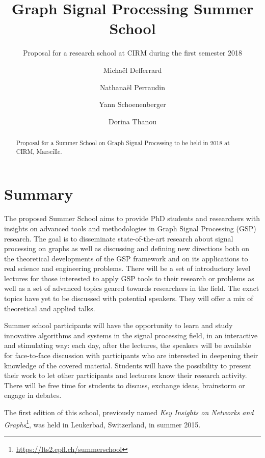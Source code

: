 \documentclass[a4paper]{scrartcl}
\begin{document}
\title{Graph Signal Processing Summer School}
\subtitle{Proposal for a research school at CIRM during the first semester 2018}
\author{
	Michaël Defferrard \and
	Nathanaël Perraudin \and
	Yann Schoenenberger \and
	Dorina Thanou
}
\maketitle

\begin{abstract}
	Proposal for a Summer School on Graph Signal Processing to be held in 2018
	at CIRM, Marseille.
\end{abstract}

\section{Summary}

The proposed Summer School aims to provide PhD students and researchers with
insights on advanced tools and methodologies in Graph Signal Processing (GSP)
research. The goal is to disseminate state-of-the-art research about signal
processing on graphs as well as discussing and defining new directions both on
the theoretical developments of the GSP framework and on its applications to
real science and engineering problems.
There will be a set of introductory level lectures for those interested to apply
GSP tools to their research or problems as well as a set of advanced topics
geared towards researchers in the field. The exact topics have yet to be
discussed with potential speakers. They will offer a mix of theoretical and
applied talks.

Summer school participants will have the opportunity to learn and study
innovative algorithms and systems in the signal processing field, in an
interactive and stimulating way: each day, after the lectures, the speakers will
be available for face-to-face discussion with participants who are interested in
deepening their knowledge of the covered material. Students will have the
possibility to present their work to let other participants and lecturers know
their research activity. There will be free time for students to discuss,
exchange ideas, brainstorm or engage in debates.

The first edition of this school, previously named \textit{Key Insights on
Networks and Graphs}\footnote{\url{https://lts2.epfl.ch/summerschool}}, was
held in Leukerbad, Switzerland, in summer 2015.
\end{document}
